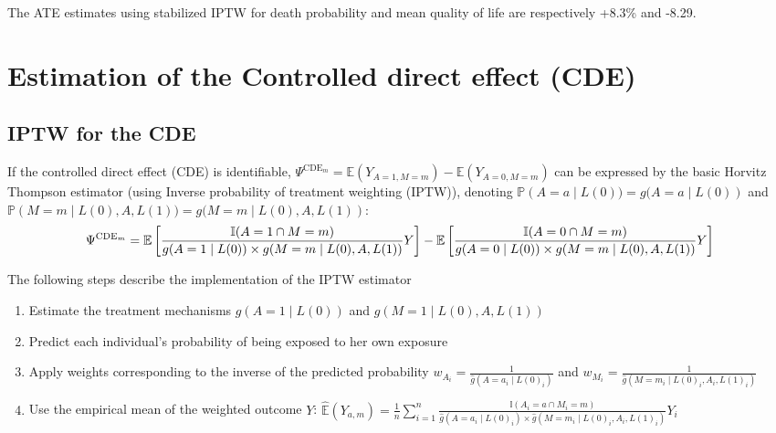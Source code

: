 \documentclass[
]{book}
\begin{document}
The ATE estimates using stabilized IPTW for death probability and mean quality of life are respectively +8.3\% and -8.29.

\hypertarget{estimation-of-the-controlled-direct-effect-cde}{%
\section{Estimation of the Controlled direct effect (CDE)}\label{estimation-of-the-controlled-direct-effect-cde}}

\hypertarget{iptw-for-the-cde}{%
\subsection{IPTW for the CDE}\label{iptw-for-the-cde}}

If the controlled direct effect (CDE) is identifiable, \(\Psi^{\text{CDE}_m} = \mathbb{E}(Y_{A=1,M=m}) - \mathbb{E}(Y_{A=0,M=m})\) can be expressed by the basic Horvitz Thompson estimator (using Inverse probability of treatment weighting (IPTW)), denoting \(\mathbb{P}\left(A=a \mid L(0)) = g(A=a \mid L(0)\right)\) and \(\mathbb{P}\left(M=m \mid L(0),A,L(1)) = g(M=m \mid L(0),A,L(1)\right)\):
\begin{equation}
\small
\Psi^{\text{CDE}_m} = \mathbb{E}\left[ \frac{\mathbb{I}(A=1 \cap M=m)}{g(A=1 \mid L(0)) \times g(M=m \mid L(0),A,L(1))} Y \right] - \mathbb{E}\left[ \frac{\mathbb{I}(A=0 \cap M=m)}{g(A=0 \mid L(0)) \times g(M=m \mid L(0),A,L(1))} Y \right]
\end{equation}

The following steps describe the implementation of the IPTW estimator

\begin{enumerate}
\def\labelenumi{\arabic{enumi}.}
\item
  Estimate the treatment mechanisms \(g\left(A=1 \mid L(0)\right)\) and \(g\left(M=1 \mid L(0),A,L(1)\right)\)
\item
  Predict each individual's probability of being exposed to her own exposure
\item
  Apply weights corresponding to the inverse of the predicted probability \(w_{A_i} = \frac{1}{\hat{g}(A = a_i \mid L(0)_i)}\) and \(w_{M_i} = \frac{1}{\hat{g}(M = m_i \mid L(0)_i,A_i,L(1)_i)}\)
\item
  Use the empirical mean of the weighted outcome \(Y\): \(\hat{\mathbb{E}}(Y_{a,m}) = \frac{1}{n} \sum_{i=1}^n \frac{\mathbb{I}(A_i=a \cap M_i=m)}{\hat{g}(A=a_i \mid L(0)_i) \times \hat{g}(M=m_i \mid L(0)_i,A_i,L(1)_i)} Y_i\)
\end{enumerate}
\end{document}
